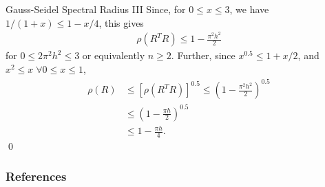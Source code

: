\documentclass{beamer}
\begin{document}
\begin{frame}{Gauss-Seidel Spectral Radius III}
  Since, for $0 \leq x \leq 3$, we have $1/(1+x) \leq 1-x/4$, this gives
  \begin{align}
   \rho(R^TR) \leq 1-\frac{\pi^2h^2}{2} \nonumber
  \end{align}
  for $0 \leq 2\pi^2h^2 \leq 3$ or equivalently $n \geq 2$.
  Further, since $x^{0.5} \leq 1+x/2$, and $x^2 \leq x \; \forall 0 \leq x \leq 1$,
   \begin{align}
    \rho(R) &\leq \left[ \rho(R^TR) \right]^{0.5} \leq (1-\frac{\pi^2h^2}{2})^{0.5} \nonumber \\
            &\leq (1-\frac{\pi h}{2})^{0.5} \nonumber \\
            &\leq 1-\frac{\pi h}{4}. \nonumber
   \end{align}
  \qed \\
  \hyperlink{gaussSeidel}{}
\end{frame}


\begin{frame}[allowframebreaks]
 \frametitle{References}
 
 
\end{frame}
\end{document}
